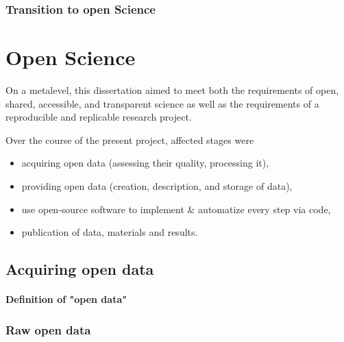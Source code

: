 \subsubsection{Transition to open Science}




\section{Open Science}

On a metalevel, this dissertation aimed to meet both the requirements of open,
shared, accessible, and transparent science \citep[cf.][]{watson2015will,
fecher2014open} as well as the requirements of a reproducible and replicable
research project.



%
Over the course of the present project, affected stages were

\begin{itemize}
    \item acquiring open data (assessing their quality, processing it),
    \item providing open data (creation, description, and storage of data),
    \item use open-source software to implement \& automatize every step via
        code,
    \item publication of data, materials and results.
\end{itemize}



\subsection{Acquiring open data}

\paragraph{Definition of "open data"}


\subsubsection{Raw open data}

